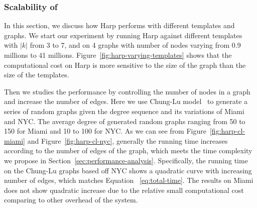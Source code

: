 \subsubsection{Scalability of \harpsahad{}}

In this section, we discuss how Harp performs with different templates and
graphs. We start our experiment by running Harp against different templates with
$|k|$ from 3 to 7, and on 4 graphs with number of nodes varying from 0.9
millions to 41 millions. Figure~\ref{fig:harp-varying-templates} shows that the
computational cost on Harp is more sensitive to the size of the graph than the
size of the templates.    


Then we studies the performance by controlling the number of nodes in a graph and
increase the number of edges. Here we use Chung-Lu model~\cite{aiello2000random}
to generate a series of random graphs given the degree sequence and its
variations of Miami and NYC.  The average degree of generated random graphs
ranging from 50 to 150 for Miami and 10 to 100 for NYC. As we can see from
Figure~\ref{fig:harp-cl-miami} and Figure~\ref{fig:harp-cl-nyc}, generally the
running time increases according to the number of edges of the graph, which
meets the time complexity we propose in Section~\ref{sec:performance-analysis}.
Specifically, the running time on the Chung-Lu graphs based off NYC shows a
quadratic curve with increasing number of edges, which matches Equation
~\ref{eq:total-time}. The results on Miami does not show quadratic increase
due to the relative small computational cost comparing to other overhead of the
system.  


